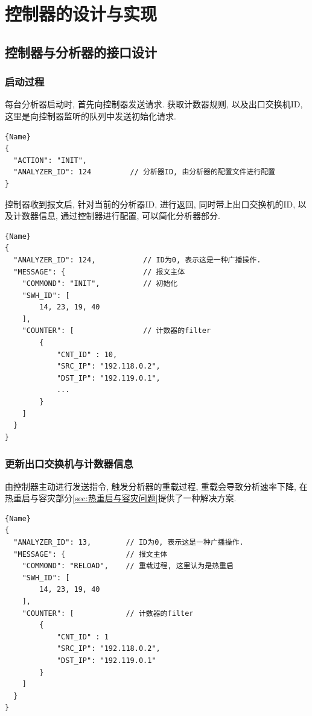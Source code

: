 
\chapter{控制器的设计与实现}

\section{控制器与分析器的接口设计}
\label{sec:分析器, 控制器接口设计}

\subsection{启动过程}

每台分析器启动时, 首先向控制器发送请求. 获取计数器规则, 以及出口交换机ID,
这里是向控制器监听的队列中发送初始化请求.

\begin{lstlisting}[caption=分析器初始化请求]{Name}
{
  "ACTION": "INIT",
  "ANALYZER_ID": 124         // 分析器ID, 由分析器的配置文件进行配置
}
\end{lstlisting}

控制器收到报文后, 针对当前的分析器ID, 进行返回, 同时带上出口交换机的ID,
以及计数器信息, 通过控制器进行配置, 可以简化分析器部分.

\begin{lstlisting}[caption=控制器返回报文]{Name}
{
  "ANALYZER_ID": 124,           // ID为0, 表示这是一种广播操作.
  "MESSAGE": {                  // 报文主体
    "COMMOND": "INIT",          // 初始化
    "SWH_ID": [
        14, 23, 19, 40
    ],
    "COUNTER": [                // 计数器的filter
        {
            "CNT_ID" : 10,
            "SRC_IP": "192.118.0.2",
            "DST_IP": "192.119.0.1",
            ...
        }
    ]
  }
}
\end{lstlisting}

\subsection{更新出口交换机与计数器信息}

由控制器主动进行发送指令, 触发分析器的重载过程, 重载会导致分析速率下降,
在热重启与容灾部分\ref{sec:热重启与容灾问题}提供了一种解决方案.

\begin{lstlisting}[caption=控制器下发指令]{Name}
{
  "ANALYZER_ID": 13,        // ID为0, 表示这是一种广播操作.
  "MESSAGE": {              // 报文主体
    "COMMOND": "RELOAD",    // 重载过程, 这里认为是热重启
    "SWH_ID": [
        14, 23, 19, 40
    ],
    "COUNTER": [            // 计数器的filter
        {
            "CNT_ID" : 1
            "SRC_IP": "192.118.0.2",
            "DST_IP": "192.119.0.1"
        }
    ]
  }
}
\end{lstlisting}

